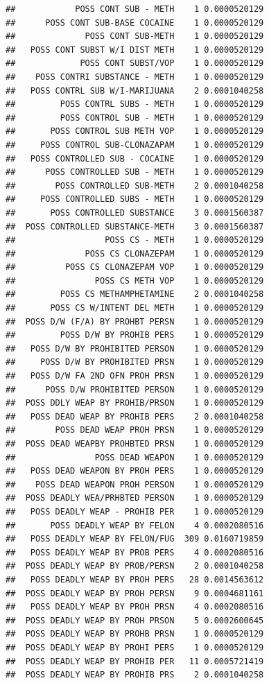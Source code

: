 \documentclass[]{book}
\begin{document}
\begin{verbatim}
##            POSS CONT SUB - METH    1 0.0000520129
##      POSS CONT SUB-BASE COCAINE    1 0.0000520129
##              POSS CONT SUB-METH    1 0.0000520129
##   POSS CONT SUBST W/I DIST METH    1 0.0000520129
##             POSS CONT SUBST/VOP    1 0.0000520129
##    POSS CONTRI SUBSTANCE - METH    1 0.0000520129
##   POSS CONTRL SUB W/I-MARIJUANA    2 0.0001040258
##         POSS CONTRL SUBS - METH    1 0.0000520129
##         POSS CONTROL SUB - METH    1 0.0000520129
##       POSS CONTROL SUB METH VOP    1 0.0000520129
##     POSS CONTROL SUB-CLONAZAPAM    1 0.0000520129
##   POSS CONTROLLED SUB - COCAINE    1 0.0000520129
##      POSS CONTROLLED SUB - METH    1 0.0000520129
##        POSS CONTROLLED SUB-METH    2 0.0001040258
##     POSS CONTROLLED SUBS - METH    1 0.0000520129
##       POSS CONTROLLED SUBSTANCE    3 0.0001560387
##  POSS CONTROLLED SUBSTANCE-METH    3 0.0001560387
##                  POSS CS - METH    1 0.0000520129
##              POSS CS CLONAZEPAM    1 0.0000520129
##          POSS CS CLONAZEPAM VOP    1 0.0000520129
##                POSS CS METH VOP    1 0.0000520129
##         POSS CS METHAMPHETAMINE    2 0.0001040258
##       POSS CS W/INTENT DEL METH    1 0.0000520129
##  POSS D/W (F/A) BY PROHBT PERSN    1 0.0000520129
##         POSS D/W BY PROHIB PERS    1 0.0000520129
##   POSS D/W BY PROHIBITED PERSON    1 0.0000520129
##     POSS D/W BY PROHIBITED PRSN    1 0.0000520129
##   POSS D/W FA 2ND OFN PROH PRSN    1 0.0000520129
##      POSS D/W PROHIBITED PERSON    1 0.0000520129
##  POSS DDLY WEAP BY PROHIB/PRSON    1 0.0000520129
##   POSS DEAD WEAP BY PROHIB PERS    2 0.0001040258
##        POSS DEAD WEAP PROH PRSN    1 0.0000520129
##  POSS DEAD WEAPBY PROHBTED PRSN    1 0.0000520129
##                POSS DEAD WEAPON    1 0.0000520129
##   POSS DEAD WEAPON BY PROH PERS    1 0.0000520129
##    POSS DEAD WEAPON PROH PERSON    1 0.0000520129
##  POSS DEADLY WEA/PRHBTED PERSON    1 0.0000520129
##   POSS DEADLY WEAP - PROHIB PER    1 0.0000520129
##       POSS DEADLY WEAP BY FELON    4 0.0002080516
##   POSS DEADLY WEAP BY FELON/FUG  309 0.0160719859
##   POSS DEADLY WEAP BY PROB PERS    4 0.0002080516
##  POSS DEADLY WEAP BY PROB/PERSN    2 0.0001040258
##   POSS DEADLY WEAP BY PROH PERS   28 0.0014563612
##  POSS DEADLY WEAP BY PROH PERSN    9 0.0004681161
##   POSS DEADLY WEAP BY PROH PRSN    4 0.0002080516
##  POSS DEADLY WEAP BY PROH PRSON    5 0.0002600645
##  POSS DEADLY WEAP BY PROHB PRSN    1 0.0000520129
##  POSS DEADLY WEAP BY PROHI PERS    1 0.0000520129
##  POSS DEADLY WEAP BY PROHIB PER   11 0.0005721419
##  POSS DEADLY WEAP BY PROHIB PRS    2 0.0001040258

\end{verbatim}
\end{document}
